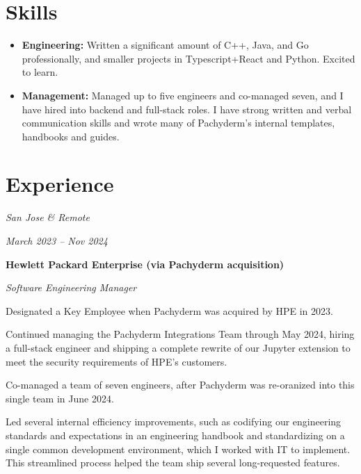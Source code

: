 \documentclass[10pt, letterpaper]{article}
\begin{document}
\section{Skills}

\begin{onecolentry}
  \begin{itemize}[label={},itemindent=-0.4cm-10pt]
        \item\textbf{Engineering:} Written a significant amount of C++, Java, and Go professionally, and smaller projects in Typescript+React and Python. Excited to learn.

        \item\textbf{Management:} Managed up to five engineers and co-managed seven, and I have hired into backend and full-stack roles. I have strong written and verbal communication skills and wrote many of Pachyderm's internal templates, handbooks and guides.
    \end{itemize}
\end{onecolentry}

\section{Experience}

\begin{twocolentry}{
    \textit{San Jose \& Remote}

    \textit{March 2023 – Nov 2024}
}
    \textbf{Hewlett Packard Enterprise (via Pachyderm acquisition)}

    \textit{Software Engineering Manager}
\end{twocolentry}

\vspace{0.1 cm}

\begin{onecolentry}
    \begin{highlights}
        \item Designated a Key Employee when Pachyderm was acquired by HPE in 2023.
        \item Continued managing the Pachyderm Integrations Team through May 2024, hiring a full-stack engineer and shipping a complete rewrite of our Jupyter extension to meet the security requirements of HPE's customers.
        \item Co-managed a team of seven engineers, after Pachyderm was re-oranized into this single team in June 2024.
        \item Led several internal efficiency improvements, such as codifying our engineering standards and expectations in an engineering handbook and standardizing on a single common development environment, which I worked with IT to implement. This streamlined process helped the team ship several long-requested features.
    \end{highlights}
\end{onecolentry}
\end{document}
